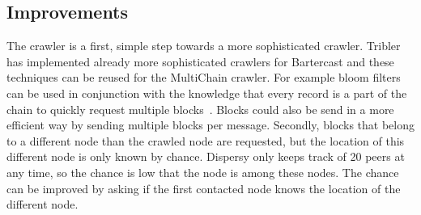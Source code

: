 \subsection{Improvements}
The crawler is a first, simple step towards a more sophisticated crawler.
Tribler has implemented already more sophisticated crawlers for Bartercast
and these techniques can be reused for the MultiChain crawler.
For example bloom filters can be used in conjunction with the knowledge
that every record is a part of the chain to quickly request multiple blocks~\cite{broder-bloomfilter,logiotatidis-splash}.
Blocks could also be send in a more efficient way by sending multiple blocks per message.
Secondly, blocks that belong to a different node than the crawled node are requested,
but the location of this different node is only known by chance.
Dispersy only keeps track of 20 peers at any time, so the chance is low that the node is among these nodes.
The chance can be improved by asking if the first contacted node knows the location of the different node.


